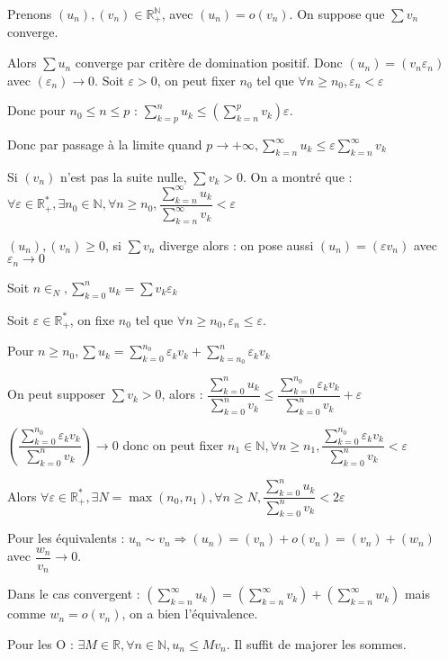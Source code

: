 \documentclass[a4paper,12pt]{book}
\newcommand{\Pre}[1]{\begin{tcolorbox}[sharp corners, colback=white,colframe=green!60!green!30!black!75, title=Preuve]#1\end{tcolorbox}}
\def\R{\mathbb{R}}
\def\N{\mathbb{N}}
\begin{document}
\Pre{Prenons $(u_n), (v_n)\in\R_+^\N$, avec $(u_n)=o(v_n)$. On suppose que $\sum v_n$ converge.
\par Alors $\sum u_n$ converge par critère de domination positif. Donc $(u_n) = (v_n\varepsilon_n)$ avec $(\varepsilon_n)\to 0$. Soit $\varepsilon>0$, on peut fixer $n_0$ tel que $\forall n\geq n_0, \varepsilon_n<\varepsilon$
\par Donc pour $n_0\leq n\leq p$ : $\sum\limits_{k=p}^nu_k\leq \left(\sum\limits_{k=n}^p v_k\right)\varepsilon$.
\par Donc par passage à la limite quand $p\to+\infty, \sum\limits_{k=n}^\infty u_k\leq \varepsilon\sum\limits_{k=n}^{\infty}v_k$
\par Si $(v_n)$ n'est pas la suite nulle, $\sum v_k>0$. On a montré que : $\forall\varepsilon\in\R_+^*, \exists n_0\in\N, \forall n\geq n_0, \dfrac{\sum\limits_{k=n}^\infty u_k}{\sum\limits_{k=n}^\infty v_k}<\varepsilon$
\par $(u_n), (v_n) \geq 0$, si $\sum v_n$ diverge alors : on pose aussi $(u_n)=(\varepsilon v_n)$ avec $\varepsilon_n\to 0$
\par Soit $n\in_N, \sum\limits_{k=0}^nu_k = \sum v_k\varepsilon_k$
\par Soit $\varepsilon\in\R_+^*$, on fixe $n_0$ tel que $\forall n\geq n_0, \varepsilon_n\leq \varepsilon$.
\par Pour $n\geq n_0, \sum u_k = \sum\limits_{k=0}^{n_0} \varepsilon_k v_k + \sum\limits_{k=n_0}^n \varepsilon_k v_k$
\par On peut supposer $\sum v_k>0$, alors : $\dfrac{\sum\limits_{k=0}^n u_k}{\sum\limits_{k=0}^n v_k} \leq \dfrac{\sum\limits_{k=0}^{n_0} \varepsilon_k v_k}{\sum\limits_{k=0}^n v_k} + \varepsilon$
\par $\left( \dfrac{\sum\limits_{k=0}^{n_0}\varepsilon_k v_k}{\sum\limits_{k=0}^n v_k}\right)\to 0$ donc on peut fixer $n_1\in\N, \forall n\geq n_1, \dfrac{\sum\limits_{k=0}^{n_0}\varepsilon_k v_k}{\sum\limits_{k=0}^n v_k} < \varepsilon$
\par Alors $\forall\varepsilon\in\R_+^*, \exists N=\max(n_0, n_1), \forall n\geq N, \dfrac{\sum\limits_{k=0}^n u_k}{\sum\limits_{k=0}^n v_k} < 2\varepsilon$
\par Pour les équivalents : $u_n\sim v_n \Rightarrow (u_n) =(v_n) + o(v_n) = (v_n) + (w_n)$ avec $\dfrac{w_n}{v_n}\to 0$.
\par Dans le cas convergent : $\left(\sum\limits_{k=n}^\infty u_k\right) = \left(\sum\limits_{k=n}^\infty v_k\right) + \left(\sum\limits_{k=n}^\infty w_k\right)$ mais comme $w_n = o(v_n)$, on a bien l'équivalence.
\par Pour les O : $\exists M\in\R,\forall n\in\N, u_n\leq Mv_n$. Il suffit de majorer les sommes.
}
\end{document}
